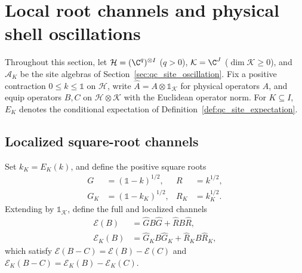 
\section{Local root channels and physical shell oscillations}
\label{sec:al_channel_shell_oscillation}

Throughout this section, let $\mathcal H=(\C^q)^{\otimes I}$ ($q>0$),
$\mathcal K=\C^J$ ($\dim\mathcal K\ge0$), and $\mathcal A_K$ be the site
algebras of Section~\ref{sec:qc_site_oscillation}. Fix a positive contraction
$0\le k\le\mathbb 1$ on $\mathcal H$, write $\widehat A=A\otimes\mathbb 1_{\mathcal K}$
for physical operators $A$, and equip operators $B,C$ on
$\mathcal H\otimes\mathcal K$ with the Euclidean operator norm. For
$K\subseteq I$, $E_K$ denotes the conditional expectation of
Definition~\ref{def:qc_site_expectation}.

\subsection{Localized square-root channels}

\begin{definition}
    \label{def:al_local_root_channel}
    \leanok
    Set $k_K=E_K(k)$, and define the positive square roots
    \begin{align}
        G   & =(\mathbb 1-k)^{1/2},   & R   & =k^{1/2},
        \label{eq:al_shell_full_roots}                    \\
        G_K & =(\mathbb 1-k_K)^{1/2}, & R_K & =k_K^{1/2}.
        \label{eq:al_shell_local_roots}
    \end{align}
    Extending \cite[Section~10]{OpenAI2026AreaLaw} by $\mathbb 1_{\mathcal K}$,
    define the full and localized channels
    \begin{align}
        \mathcal E(B)   & =\widehat G B\widehat G+\widehat R B\widehat R,
        \label{eq:al_shell_full_channel}                                  \\
        \mathcal E_K(B) & =\widehat G_K B\widehat G_K
        +\widehat R_K B\widehat R_K,
        \label{eq:al_shell_local_channel}
    \end{align}
    which satisfy $\mathcal E(B-C)=\mathcal E(B)-\mathcal E(C)$ and
    $\mathcal E_K(B-C)=\mathcal E_K(B)-\mathcal E_K(C)$.
\end{definition}

